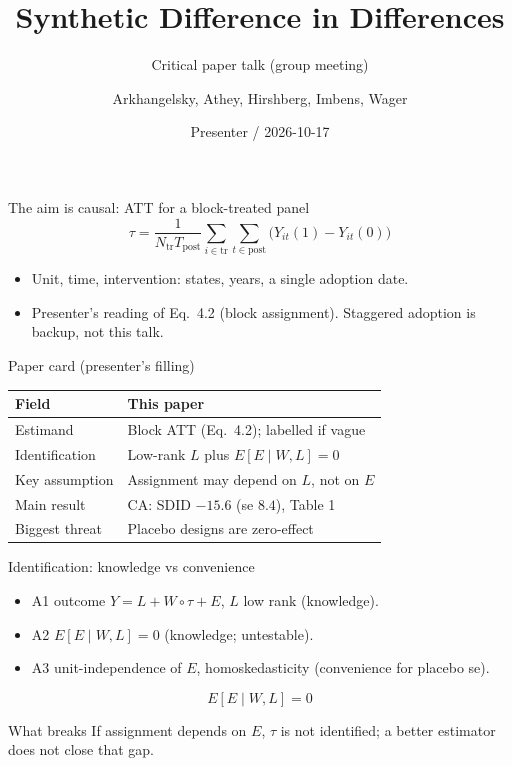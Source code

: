 \documentclass[aspectratio=169,10pt]{beamer}
\title{Synthetic Difference in Differences}
\subtitle{Critical paper talk (group meeting)}
\author{Arkhangelsky, Athey, Hirshberg, Imbens, Wager}
\institute{arXiv:1812.09970 (July 2021 version)}
\date{Presenter / 2026-10-17}
\begin{document}
\begin{frame}
  \titlepage
\end{frame}

\begin{frame}{The aim is causal: ATT for a block-treated panel}
  \begin{equation*}
    \tau = \frac{1}{N_{\mathrm{tr}}T_{\mathrm{post}}}
    \sum_{i \in \mathrm{tr}}\sum_{t \in \mathrm{post}}
    \bigl(Y_{it}(1)-Y_{it}(0)\bigr)
  \end{equation*}
  \begin{itemize}
    \item Unit, time, intervention: states, years, a single adoption date.
    \item Presenter's reading of Eq.~4.2 (block assignment). Staggered
      adoption is backup, not this talk.
  \end{itemize}
\end{frame}

\begin{frame}{Paper card (presenter's filling)}
  \vspace{4pt}
  \begin{tabular}{ll}
    \toprule
    Field & This paper \\
    \midrule
    Estimand & Block ATT (Eq.~4.2); labelled if vague \\
    Identification & Low-rank \(L\) plus \(E[E\mid W,L]=0\) \\
    Key assumption & Assignment may depend on \(L\), not on \(E\) \\
    Main result & CA: SDID \(-15.6\) (se \(8.4\)), Table 1 \\
    Biggest threat & Placebo designs are zero-effect \\
    \bottomrule
  \end{tabular}
\end{frame}

\begin{frame}{Identification: knowledge vs convenience}
  \begin{itemize}
    \item A1 outcome \(Y=L+W\circ\tau+E\), \(L\) low rank (knowledge).
    \item A2 \(E[E\mid W,L]=0\) (knowledge; untestable).
    \item A3 unit-independence of \(E\), homoskedasticity (convenience
      for placebo se).
  \end{itemize}
  \begin{equation*}
    E[E \mid W, L] = 0
  \end{equation*}
  \begin{block}{What breaks}
    If assignment depends on \(E\), \(\tau\) is not identified; a better
    estimator does not close that gap.
  \end{block}
\end{frame}
\end{document}
